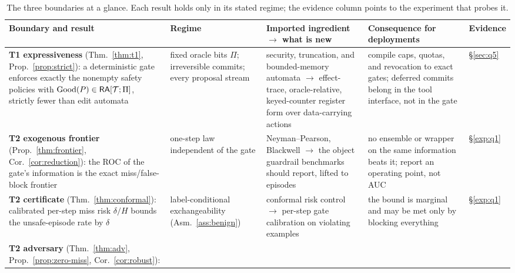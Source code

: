 \begin{table}[t]
\caption{The three boundaries at a glance. Each result holds only in its stated regime; the
evidence column points to the experiment that probes it.}
\label{tab:summary}
\centering\footnotesize
\setlength{\tabcolsep}{4pt}
\renewcommand{\arraystretch}{1.12}
\begin{tabularx}{\textwidth}{@{}>{\raggedright\arraybackslash}p{}>{\raggedright\arraybackslash}p{}>{\raggedright\arraybackslash}X>{\raggedright\arraybackslash}X>{\raggedright\arraybackslash}p{}@{}}
\toprule
Boundary and result & Regime & Imported ingredient $\rightarrow$ what is new & Consequence for deployments & Evidence\\
\midrule
\textbf{T1 expressiveness} (Thm.~\ref{thm:t1}, Prop.~\ref{prop:strict}): a deterministic gate
enforces exactly the nonempty safety policies with $\mathrm{Good}(P)\in\mathsf{RA}[\mathcal{T};\Pi]$, strictly fewer than
edit automata
& fixed oracle bits $\Pi$; irreversible commits; every proposal stream
& security, truncation, and bounded-memory automata
\citep{schneider2000enforceable,ligatti2005edit,talhi2008memory} $\rightarrow$
effect-trace, oracle-relative, keyed-counter register form over data-carrying actions
& compile caps, quotas, and revocation to exact gates; deferred commits belong in the tool
interface, not in the gate
& \S\ref{sec:q5}\\
\addlinespace
\textbf{T2 exogenous frontier} (Prop.~\ref{thm:frontier}, Cor.~\ref{cor:reduction}): the ROC of the
gate's information is the exact miss/false-block frontier
& one-step law independent of the gate
& Neyman--Pearson, Blackwell $\rightarrow$ the object guardrail benchmarks should report, lifted
to episodes
& no ensemble or wrapper on the same information beats it; report an operating point, not AUC
& \S\ref{exp:q1}\\
\addlinespace
\textbf{T2 certificate} (Thm.~\ref{thm:conformal}): calibrated per-step miss risk $\delta/H$ bounds
the unsafe-episode rate by $\delta$
& label-conditional exchangeability (Asm.~\ref{ass:benign})
& conformal risk control $\rightarrow$ per-step gate calibration on violating examples
& the bound is marginal and may be met only by blocking everything
& \S\ref{exp:q1}\\
\addlinespace
\textbf{T2 adversary} (Thm.~\ref{thm:adv}, Prop.~\ref{prop:zero-miss}, Cor.~\ref{cor:robust}):

\end{tabularx}
\end{table}
